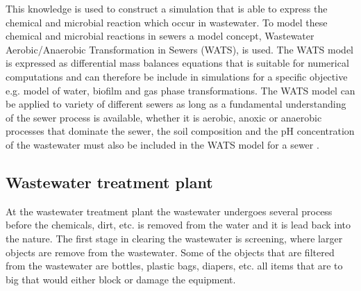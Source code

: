 This knowledge is used to construct a simulation that is able to express the chemical and microbial reaction which occur in wastewater. %
To model these chemical and microbial reactions in sewers a model concept, Wastewater Aerobic/Anaerobic Transformation in Sewers (WATS), is used. The WATS model is expressed as differential mass balances equations that is suitable for numerical computations and can therefore be include in simulations for a specific objective e.g. model of water, biofilm and gas phase transformations. The WATS model can be applied to variety of different sewers as long as a fundamental understanding of the sewer process is available, whether it is aerobic, anoxic or anaerobic processes that dominate the sewer, the soil composition and the pH concentration of the wastewater must also be included in the WATS model for a sewer \cite{Sewer_processes}.     





\subsection{Wastewater treatment plant}\label{subse:Wastewater treatment plant}
At the wastewater treatment plant the wastewater undergoes several process before the chemicals, dirt, etc. is removed from the water and it is lead back into the nature. The first stage in clearing the wastewater is screening, where larger objects are remove from the wastewater. Some of the objects that are filtered from the wastewater are bottles, plastic bags, diapers, etc. all items that are to big that would either block or damage the equipment. 

